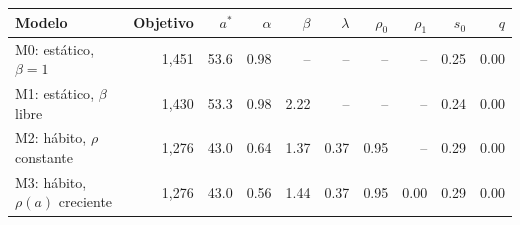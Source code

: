 \begin{tabular}{lrrrrrrrrr}
\toprule
Modelo & Objetivo & $a^*$ & $\alpha$ & $\beta$ & $\lambda$ & $\rho_0$ & $\rho_1$ & $s_0$ & $q$ \\
\midrule
M0: estático{,} $\beta=1$ & 1{,}451 & 53.6 & 0.98 & -- & -- & -- & -- & 0.25 & 0.00 \\
M1: estático{,} $\beta$ libre & 1{,}430 & 53.3 & 0.98 & 2.22 & -- & -- & -- & 0.24 & 0.00 \\
M2: hábito{,} $\rho$ constante & 1{,}276 & 43.0 & 0.64 & 1.37 & 0.37 & 0.95 & -- & 0.29 & 0.00 \\
M3: hábito{,} $\rho(a)$ creciente & 1{,}276 & 43.0 & 0.56 & 1.44 & 0.37 & 0.95 & 0.00 & 0.29 & 0.00 \\
\bottomrule
\end{tabular}